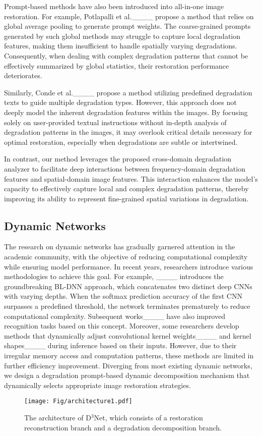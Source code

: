Prompt-based methods have also been introduced into all-in-one image restoration. For example, Potlapalli et al.____ propose a method that relies on global average pooling to generate prompt weights. The coarse-grained prompts generated by such global methods may struggle to capture local degradation features, making them insufficient to handle spatially varying degradations. Consequently, when dealing with complex degradation patterns that cannot be effectively summarized by global statistics, their restoration performance deteriorates.

Similarly, Conde et al.____ propose a method utilizing predefined degradation texts to guide multiple degradation types. However, this approach does not deeply model the inherent degradation features within the images. By focusing solely on user-provided textual instructions without in-depth analysis of degradation patterns in the images, it may overlook critical details necessary for optimal restoration, especially when degradations are subtle or intertwined.

In contrast, our method leverages the proposed cross-domain degradation analyzer to facilitate deep interactions between frequency-domain degradation features and spatial-domain image features. This interaction enhances the model's capacity to effectively capture local and complex degradation patterns, thereby improving its ability to represent fine-grained spatial variations in degradation. 
\subsection{Dynamic Networks}
The research on dynamic networks has gradually garnered attention in the academic community, with the objective of reducing computational complexity while ensuring model performance. In recent years, researchers introduce various methodologies to achieve this goal. For example, ____ introduces the groundbreaking BL-DNN approach, which concatenates two distinct deep CNNs with varying depths. When the softmax prediction accuracy of the first CNN surpasses a predefined threshold, the network terminates prematurely to reduce computational complexity. Subsequent works____ have also improved recognition tasks based on this concept.
Moreover, some researchers develop methods that dynamically adjust convolutional kernel weights____ and kernel shapes____ during inference based on their inputs. However, due to their irregular memory access and computation patterns, these methods are limited in further efficiency improvement. Diverging from most existing dynamic networks, we design a degradation prompt-based dynamic decomposition mechanism that dynamically selects appropriate image restoration strategies.
\begin{figure*}[t] 
\centering 
\texttt{[image: Fig/architecture1.pdf]} 
\caption{The architecture of D$^3$Net, which consists of a restoration reconstruction branch and a degradation decomposition branch.} 
\label{fig:2} 
\end{figure*}
